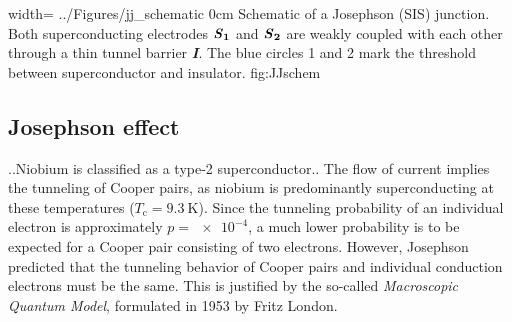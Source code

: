 {width=\textwidth}
{../Figures/jj_schematic}
{0cm}
{Schematic of a Josephson (SIS) junction. Both superconducting electrodes $\textbf{\textit{S}}_\textbf{1}$ and $\textbf{\textit{S}}_\textbf{2}$ are weakly coupled with each other through a thin tunnel barrier \textbf{\textit{I}}. The blue circles 1 and 2 mark the threshold between superconductor and insulator.}
{fig:JJschem}


        
\subsection{Josephson effect}


\cite{Bardeen1957} ..Niobium is classified as a type-2 superconductor..
The flow of current implies the tunneling of Cooper pairs, as niobium is predominantly superconducting at these temperatures ($T_\mathrm{c} = \qty{9.3}{\kelvin}$). Since the tunneling probability of an individual electron is approximately $p = \num{e-4}$, a much lower probability is to be expected for a Cooper pair consisting of two electrons. However, Josephson predicted that the tunneling behavior of Cooper pairs and individual conduction electrons must be the same. This is justified by the so-called \textit{Macroscopic Quantum Model}, formulated in 1953 by Fritz London.

